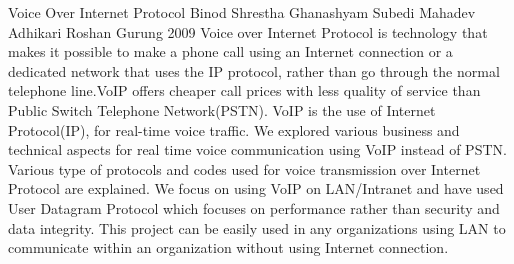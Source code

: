  \begin{conf-abstract}[]
{Voice Over Internet Protocol}
{
Binod Shrestha
Ghanashyam Subedi
Mahadev Adhikari
Roshan Gurung
}
{2009}
Voice over Internet Protocol is technology that makes it possible to make a phone call using an Internet connection or a dedicated network  that uses the IP protocol,
rather than go through the normal telephone line.VoIP offers cheaper call prices with less quality of service than Public Switch Telephone Network(PSTN). VoIP is the use of Internet Protocol(IP), for real-time voice traffic. We explored various business and technical aspects for real time voice communication using VoIP instead of PSTN. Various type of protocols and codes used for voice transmission over Internet Protocol are explained. We focus on using VoIP on LAN/Intranet and have used User Datagram Protocol which focuses on performance rather than security and data integrity. This project can be easily used in any organizations using LAN to communicate within an organization without using Internet connection. 
  \end{conf-abstract}
